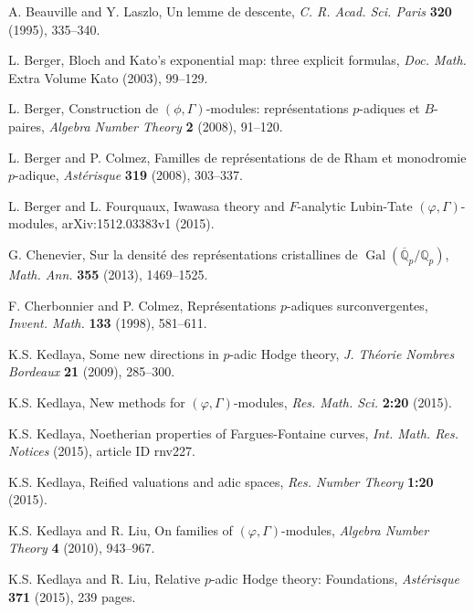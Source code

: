 \documentclass[12pt]{amsart}
\theoremstyle{definition}
\numberwithin{equation}{theorem}
\newcommand{\QQ}{\mathbb{Q}}
\DeclareMathOperator{\Gal}{Gal}
\begin{document}
\begin{thebibliography}{99}

A. Beauville and Y. Laszlo, Un lemme de descente, \textit{C. R. Acad. Sci. Paris} \textbf{320} (1995), 335--340.

L. Berger, Bloch and Kato's exponential map: three explicit formulas,
\textit{Doc. Math.} Extra Volume Kato (2003), 99--129.

L. Berger, Construction de $(\phi, \Gamma)$-modules: repr\'esentations $p$-adiques et $B$-paires, \textit{Algebra Number Theory} \textbf{2} (2008), 91--120.

L. Berger and P. Colmez, Familles de repr\'esentations de de Rham et monodromie $p$-adique, \textit{Ast\'erisque} \textbf{319} (2008), 303--337.

L. Berger and L. Fourquaux, Iwawasa theory and $F$-analytic Lubin-Tate $(\varphi, \Gamma)$-modules, arXiv:1512.03383v1 (2015).

G. Chenevier, Sur la densit\'e des repr\'esentations cristallines de
$\Gal(\overline{\QQ}_p/\QQ_p)$, \textit{Math. Ann.} \textbf{355} (2013), 1469--1525.

F. Cherbonnier and P. Colmez, Repr\'esentations $p$-adiques surconvergentes,
\textit{Invent. Math.} \textbf{133} (1998), 581--611.

K.S. Kedlaya, Some new directions in $p$-adic Hodge theory, \textit{J. Th\'eorie Nombres Bordeaux} \textbf{21} (2009), 285--300.

K.S. Kedlaya, New methods for $(\varphi, \Gamma)$-modules,
\textit{Res. Math. Sci.} \textbf{2:20} (2015).

K.S. Kedlaya, Noetherian properties of Fargues-Fontaine curves,
\textit{Int. Math. Res. Notices} (2015), article ID rnv227. 

K.S. Kedlaya, Reified valuations and adic spaces, \textit{Res. Number Theory}
\textbf{1:20} (2015).

K.S. Kedlaya and R. Liu, On families of $(\varphi, \Gamma)$-modules,
\textit{Algebra Number Theory} \textbf{4} (2010), 943--967.

K.S. Kedlaya and R. Liu, Relative $p$-adic Hodge theory: Foundations,
\textit{Ast\'erisque} \textbf{371} (2015), 239 pages. 


\end{thebibliography}
\end{document}
